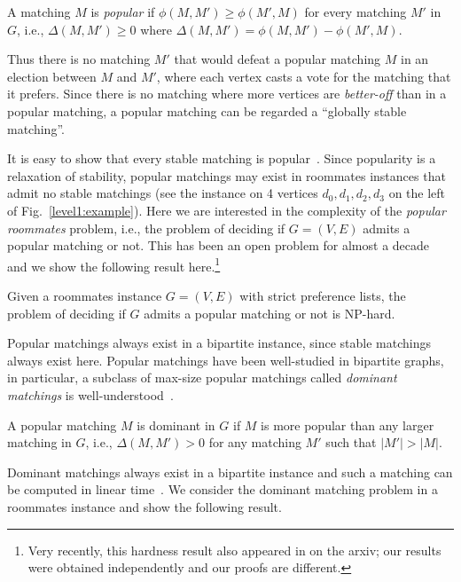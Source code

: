 \documentclass{llncs}
\begin{document}
\begin{definition}
\label{pop-def}
A matching $M$ is {\em popular} if  $\phi(M,M') \ge  \phi(M',M)$ for every matching $M'$ in $G$, 
i.e., $\Delta(M,M') \ge 0$ where $\Delta(M,M') = \phi(M,M') -  \phi(M',M)$.
\end{definition}

Thus there is no matching $M'$ that would defeat a popular matching $M$ in an election between $M$ and $M'$, where each vertex casts a vote
for the matching that it prefers. Since there is no matching where more vertices are {\em better-off} than in a popular matching, a popular matching
can be regarded a ``globally stable matching''.

It is easy to show that every stable matching is popular~\cite{Gar75}. Since popularity is a relaxation of stability, popular matchings may exist
in roommates instances that admit no stable matchings (see the instance on 4 vertices $d_0,d_1,d_2,d_3$ on the left of Fig.~\ref{level1:example}).
Here we are interested in the complexity of the {\em popular roommates}
problem, i.e., the problem of deciding if $G = (V,E)$ admits a popular matching or not. This has been an open problem for almost a
decade~\cite{BIM10} and we show the following result here.\footnote{Very recently, this hardness result also appeared in \cite{GMSZ18} on the arxiv; our results were obtained independently and our proofs are different.}

\begin{theorem}
  \label{main-thm}
  Given a roommates instance $G = (V,E)$ with strict preference lists, the problem of deciding if $G$ admits a popular matching or not is NP-hard.
\end{theorem}  
  

Popular matchings always exist in a bipartite instance, since stable matchings always exist here.
Popular matchings have been well-studied in bipartite graphs, in particular,
a subclass of max-size popular matchings called {\em dominant matchings} is well-understood~\cite{CK16,HK11,Kav12}.

\begin{definition}
  A popular matching $M$ is dominant in $G$ if $M$ is more popular than any larger matching in $G$, i.e.,  $\Delta(M,M') > 0$ for any matching
  $M'$ such that $|M'| > |M|$.
\end{definition}  

Dominant matchings always exist in a bipartite instance and such a matching can be computed in linear time~\cite{Kav12}.
We consider the dominant matching problem in a roommates instance and show the following result. 
\end{document}
